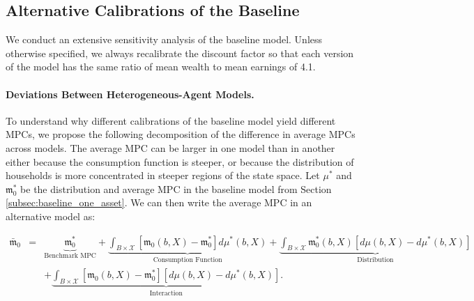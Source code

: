 




\subsection{Alternative Calibrations of the Baseline}
\label{sec:one_asset_alternative}

We conduct an extensive sensitivity analysis of the baseline model. Unless  otherwise specified, we always recalibrate the discount factor so that each version of the model has the same ratio of mean wealth to mean earnings of 4.1.


\paragraph{Deviations Between Heterogeneous-Agent Models.}

To understand why different calibrations of the baseline model yield different MPCs, we propose the following decomposition of the difference in average MPCs across models. The average MPC can be larger in one model than in another either because the consumption function is steeper, or because the distribution of households is more concentrated in steeper regions of the state space. Let $\mu^{\ast}$ and $\mathfrak{m}_{0}^{\ast}$ be the distribution and average MPC in the baseline model from Section \ref{subsec:baseline_one_asset}. We can then write the average MPC in an alternative model as:


\begin{eqnarray*} \label{eq:decomp_HA}
\bar{\mathfrak{m}}_{0}&=&\underset{\text{Benchmark MPC}}{\underbrace{\mathfrak{m}_{0}^{\ast}}}+\underset{\text{Consumption Function}}{\underbrace{\int_{B\times \mathcal{X}}\left[ \mathfrak{m}_{0}\left( b,X\right) - \mathfrak{m}_{0}^{\ast}\right] d\mu ^{\ast}\left( b,X\right) }}+\underset{ \text{Distribution}}{\underbrace{\int_{B\times \mathcal{X}}\mathfrak{m}_{0}^{\ast}\left( b,X\right) \left[ d\mu \left( b,X\right) -d\mu ^{\ast}\left( b,X\right) \right] }} \\
&& +\underset{\text{Interaction}}{\underbrace{\int_{B\times \mathcal{X}}\left[ \mathfrak{m}_{0}\left( b,X\right) -\mathfrak{m}_{0}^{\ast}\right] \left[d\mu \left( b,X\right) -d\mu ^{\ast}\left( b,X\right) \right] }}.   
\end{eqnarray*}

